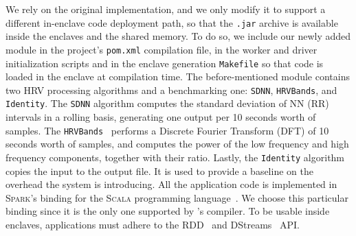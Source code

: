 We rely on the original \sgxspark implementation, and we only modify it to support a different in-enclave code deployment path, so that the \texttt{.jar} archive is available inside the enclaves and the shared memory. 
To do so, we include our newly added module in the project's \texttt{pom.xml} compilation file, in the worker and driver initialization scripts and in the enclave generation \texttt{Makefile} so that code is loaded in the enclave at compilation time.
The before-mentioned module contains two HRV processing algorithms and a benchmarking one: \texttt{SDNN}, \texttt{HRVBands}, and \texttt{Identity}.
The \texttt{SDNN} algorithm computes the standard deviation of NN (RR) intervals in a rolling basis, generating one output per 10 seconds worth of samples.
The \texttt{HRVBands}~\cite{Shaffer2017} performs a Discrete Fourier Transform (DFT) of 10 seconds worth of samples, and computes the power of the low frequency and high frequency components, together with their ratio.
Lastly, the \texttt{Identity} algorithm copies the input to the output file.
It is used to provide a baseline on the overhead the system is introducing.
All the application code is implemented in \textsc{Spark}'s binding for the \textsc{Scala} programming language~\cite{scala-language}. 
We choose this particular binding since it is the only one supported by \sgxspark's compiler.
To be usable inside \sgx enclaves, applications must adhere to the RDD~\cite{rdd-programming-guide} and DStreams~\cite{ZahariaDStreams2012} API.


